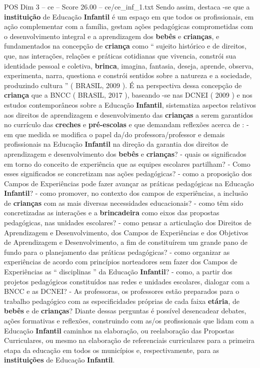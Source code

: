 \begin{textsample}{POS Dim 3 – ce – Score 26.00 – ce/ce\_inf\_1.txt}
Sendo assim, destaca -se que a \textbf{instituição} de Educação \textbf{Infantil} é um espaço em que todos os profissionais, em ação complementar com a família, gestam ações pedagógicas comprometidas com o desenvolvimento integral e a aprendizagem dos \textbf{bebês} e \textbf{crianças}, e fundamentados na concepção de \textbf{criança} como “ sujeito histórico e de direitos, que, nas interações, relações e práticas cotidianas que vivencia, constrói sua identidade pessoal e coletiva, \textbf{brinca}, imagina, fantasia, deseja, aprende, observa, experimenta, narra, questiona e constrói sentidos sobre a natureza e a sociedade, produzindo cultura ” ( BRASIL, 2009 ).
É na perspectiva dessa concepção de \textbf{criança} que a BNCC ( BRASIL, 2017 ), baseando -se nas DCNEI ( 2009 ) e nos estudos contemporâneos sobre a Educação \textbf{Infantil}, sistematiza aspectos relativos aos direitos de aprendizagem e desenvolvimento das \textbf{crianças} a serem garantidos no currículo das \textbf{creches} e \textbf{pré-escolas} e que demandam reflexões acerca de : - em que medida se modifica o papel da/do professora/professor e demais profissionais na Educação \textbf{Infantil} na direção da garantia dos direitos de aprendizagem e desenvolvimento dos \textbf{bebês} e \textbf{crianças}? - quais os significados em torno do conceito de experiência que as equipes escolares partilham? - Como esses significados se concretizam nas ações pedagógicas? - como a proposição dos Campos de Experiências pode fazer avançar as práticas pedagógicas na Educação \textbf{Infantil}? - como promover, no contexto dos campos de experiências, a inclusão de \textbf{crianças} com as mais diversas necessidades educacionais? - como têm sido concretizadas as interações e a \textbf{brincadeira} como eixos das propostas pedagógicas, nas unidades escolares? - como pensar a articulação dos Direitos de Aprendizagem e Desenvolvimento, dos Campos de Experiências e dos Objetivos de Aprendizagem e Desenvolvimento, a fim de constituírem um grande pano de fundo para o planejamento das práticas pedagógicas? - como organizar as experiências de acordo com princípios norteadores sem fazer dos Campos de Experiências as “ disciplinas ” da Educação \textbf{Infantil}? - como, a partir dos projetos pedagógicos constituídos nas redes e unidades escolares, dialogar com a BNCC e as DCNEI? - As professoras, os professores estão preparados para o trabalho pedagógico com as especificidades próprias de cada faixa \textbf{etária}, de \textbf{bebês} e de \textbf{crianças}?
Diante dessas perguntas é possível desencadear debates, ações formativas e reflexões, construindo com as/os profissionais que lidam com a Educação \textbf{Infantil} caminhos na elaboração, ou reelaboração das Propostas Curriculares, ou mesmo na elaboração de referenciais curriculares para a primeira etapa da educação em todos os municípios e, respectivamente, para as \textbf{instituições} de Educação \textbf{Infantil}.

\end{textsample}
